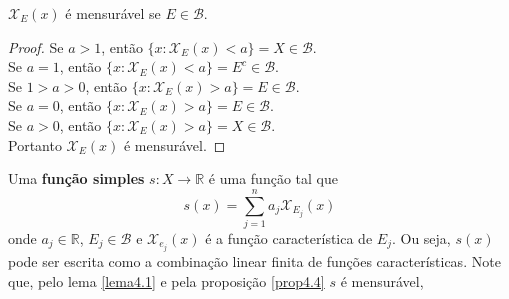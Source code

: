 \begin{lema} \label{lema4.1}
    $\mathcal{X}_E(x)$ é mensurável se $E \in \mathcal{B}$.
    \begin{proof}
        Se $a>1$, então $\{x : \mathcal{X}_E(x) < a\} = X \in \mathcal{B}$. \\ 
        Se $a=1$, então $\{x: \mathcal{X}_E(x)<a\}=E^c \in \mathcal{B}$. \\
        Se $1>a>0$, então $\{x: \mathcal{X}_E(x)>a\}=E \in \mathcal{B}$. \\ 
        Se $a=0$, então $\{x: \mathcal{X}_E(x)>a\}=E \in \mathcal{B}$. \\ 
        Se $a>0$, então $\{x: \mathcal{X}_E(x)>a\}=X \in \mathcal{B}$. \\
        Portanto $\mathcal{X}_E(x)$ é mensurável.  
    \end{proof}
\end{lema}

\begin{definicao} \label{def4.3}
    Uma \textbf{função simples} $s: X \to \mathbb{R}$ é uma função tal que 
    \[
    s(x) = \sum_{j=1} ^n a_j \mathcal{X}_{E_j} (x)    
    \]
    onde $a_j \in \mathbb{R}$, $E_j \in \mathcal{B}$ e $\mathcal{X}_{e_j}(x)$ é a função característica de $E_j$. Ou seja, $s(x)$ pode ser escrita como a combinação linear finita de funções características. Note que, pelo lema \ref{lema4.1} e pela proposição \ref{prop4.4} $s$ é mensurável,
\end{definicao}

